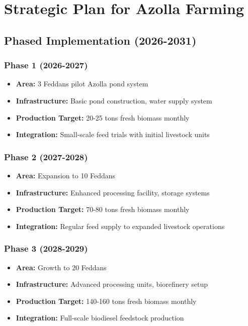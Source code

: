 \section{Strategic Plan for Azolla Farming}

\subsection{Phased Implementation (2026-2031)}

\subsubsection{Phase 1 (2026-2027)}
\begin{itemize}
    \item \textbf{Area:} 3 Feddans pilot Azolla pond system
    \item \textbf{Infrastructure:} Basic pond construction, water supply system
    \item \textbf{Production Target:} 20-25 tons fresh biomass monthly
    \item \textbf{Integration:} Small-scale feed trials with initial livestock units
\end{itemize}

\subsubsection{Phase 2 (2027-2028)}
\begin{itemize}
    \item \textbf{Area:} Expansion to 10 Feddans
    \item \textbf{Infrastructure:} Enhanced processing facility, storage systems
    \item \textbf{Production Target:} 70-80 tons fresh biomass monthly
    \item \textbf{Integration:} Regular feed supply to expanded livestock operations
\end{itemize}

\subsubsection{Phase 3 (2028-2029)}
\begin{itemize}
    \item \textbf{Area:} Growth to 20 Feddans
    \item \textbf{Infrastructure:} Advanced processing units, biorefinery setup
    \item \textbf{Production Target:} 140-160 tons fresh biomass monthly
    \item \textbf{Integration:} Full-scale biodiesel feedstock production
\end{itemize}

